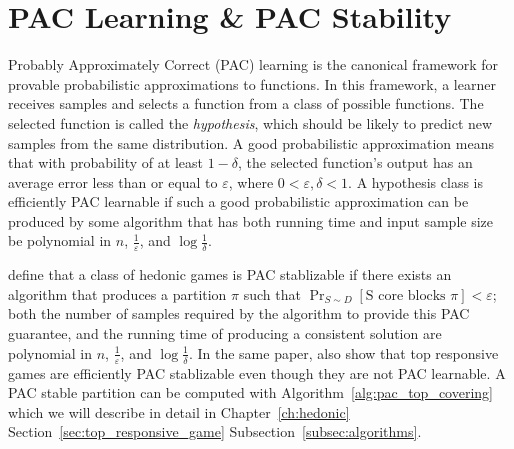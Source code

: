 \section{PAC Learning \& PAC Stability}
\label{sec:pac_learning_pac_stability}
Probably Approximately Correct (PAC) learning is the canonical framework for
provable probabilistic approximations to functions.
In this framework, a learner receives samples and selects a function from a class
of possible functions.
The selected function is called the \textit{hypothesis}, which should be likely
to predict new samples from the same distribution.
A good probabilistic approximation means that with probability of at least
$1 - \delta$, the selected function's output has an average error less than or
equal to $\varepsilon$, where $0 < \varepsilon, \delta < 1$.
A hypothesis class is efficiently PAC learnable if such a good probabilistic
approximation can be produced by some algorithm that has both running time and
input sample size be polynomial in $n$, $\frac{1}{\varepsilon}$, and
$\log{\frac{1}{\delta}}$.

 define that a class of hedonic games is PAC stablizable
if there exists an algorithm that produces a partition $\pi$ such that
$\Pr_{S\sim D}[\text{S core blocks } \pi] < \varepsilon$;
both the number of samples required by the algorithm to provide this PAC guarantee,
and the running time of producing a consistent solution are polynomial in $n$,
$\frac{1}{\varepsilon}$, and $\log{\frac{1}{\delta}}$.
In the same paper,  also show that top responsive games
are efficiently PAC stablizable even though they are not PAC learnable.
A PAC stable partition can be computed with Algorithm~\ref{alg:pac_top_covering}
which we will describe in detail in Chapter~\ref{ch:hedonic}
Section~\ref{sec:top_responsive_game} Subsection~\ref{subsec:algorithms}.
